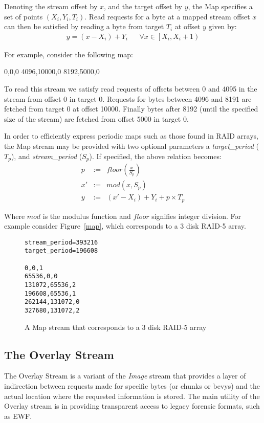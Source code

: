 \documentclass[10pt, conference]{IEEEtran}
\begin{document}
Denoting the stream offset by $x$, and the target offset by $y$, the
Map specifies a set of points $(X_i,Y_i,T_i)$. Read requests for a
byte at a mapped stream offset $x$ can then be satisfied by reading a
byte from target $T_i$ at offset $y$ given by:
\begin{eqnarray}
y = (x - X_i) + Y_i & &
\forall x \in \left [X_i, X_i+1 \right )
\end{eqnarray}

For example, consider the following map:
\begin{verbatim*}
0,0,0
4096,10000,0
8192,5000,0
\end{verbatim*}

To read this stream we satisfy read requests of offsets between 0 and
4095 in the stream from offset 0 in target 0. Requests for bytes
between 4096 and 8191 are fetched from target 0 at offset
10000. Finally bytes after 8192 (until the specified size of the
stream) are fetched from offset 5000 in target 0.

In order to efficiently express periodic maps such as those found in
RAID arrays, the Map stream may be provided with two optional
parameters a {\em target\_period} ($T_p$), and {\em stream\_period}
($S_p$). If specified, the above relation becomes:
\begin{eqnarray*}
p &:=& floor\left (\frac{x}{S_p} \right) \\
x' &:=& mod(x ,S_p)  \\   \label{eq:no1}
y &:=& (x'-X_i) + Y_i + p \times T_p
\end{eqnarray*}

Where $mod$ is the modulus function and $floor$ signifies integer
division. For example consider Figure~\ref{map}, which corresponds to a 3
disk RAID-5 array.

\begin{figure}
\begin{Verbatim}[frame=single]
stream_period=393216
target_period=196608

0,0,1
65536,0,0
131072,65536,2
196608,65536,1
262144,131072,0
327680,131072,2
\end{Verbatim}
\caption{A Map stream that corresponds to a 3 disk RAID-5 array}\label{ref}
\end{figure}

\subsection{The Overlay Stream}
The Overlay Stream is a variant of the {\em Image} stream that
provides a layer of indirection between requests made for specific
bytes (or chunks or bevys) and the actual location where the requested
information is stored. The main utility of the Overlay stream is in
providing transparent access to legacy forensic formats, such as EWF.
\end{document}
